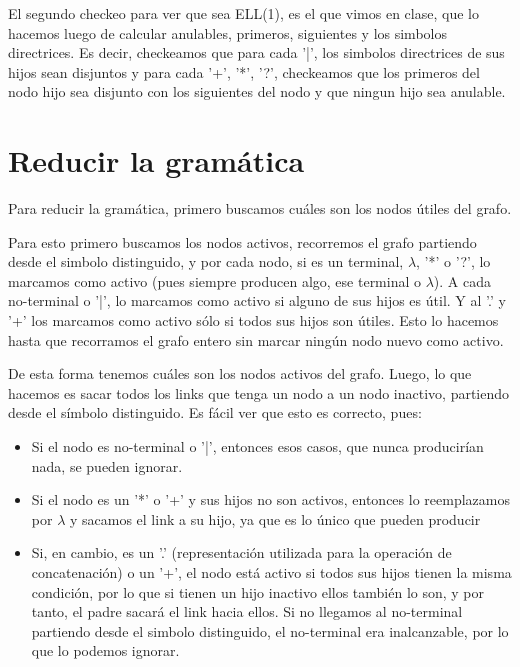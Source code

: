 \documentclass[a4paper]{report}
\begin{document}
El segundo checkeo para ver que sea ELL(1), es el que vimos en clase, que lo
hacemos luego de calcular anulables, primeros, siguientes y los simbolos
directrices. Es decir, checkeamos que para cada '|', los simbolos directrices de
sus hijos sean disjuntos y para cada '+', '*', '?', checkeamos que los primeros
del nodo hijo sea disjunto con los siguientes del nodo y que ningun hijo sea
anulable.


\section*{Reducir la gramática}

	Para reducir la gramática, primero buscamos cuáles son los nodos útiles
del grafo.


	Para esto primero buscamos los nodos activos, recorremos el grafo partiendo desde el
simbolo distinguido, y por cada nodo, si es un terminal, $\lambda$, '*' o '?', lo
marcamos como activo (pues siempre producen algo, ese terminal o $\lambda$). A cada
no-terminal o '|', lo marcamos como activo si alguno de sus hijos es útil. Y al
'.' y '+' los marcamos como activo sólo si todos sus hijos son útiles. Esto lo
hacemos hasta que recorramos el grafo entero sin marcar ningún nodo nuevo como activo.


	De esta forma tenemos cuáles son los nodos activos del grafo. Luego, lo
que hacemos es sacar todos los links que tenga un nodo a un nodo inactivo,
partiendo desde el símbolo distinguido. Es fácil ver que esto es correcto, pues:


\begin{itemize}
\item Si el nodo es no-terminal o '|', entonces esos casos, que nunca producirían nada,
se pueden ignorar.

\item Si el nodo es un '*' o '+' y sus hijos no son activos,
entonces lo reemplazamos por $\lambda$ y sacamos el link a su hijo, ya que es lo
único que pueden producir 

\item Si, en cambio, es un '.' (representación utilizada para la operación de concatenación) o un '+', el nodo está activo si todos sus hijos tienen la misma condición, por lo que si tienen un hijo 
inactivo ellos también lo son, y por tanto,
el padre sacará el link hacia ellos. Si no llegamos al no-terminal partiendo
desde el simbolo distinguido, el no-terminal era inalcanzable, por lo que lo podemos ignorar.
\end{itemize}
\end{document}
